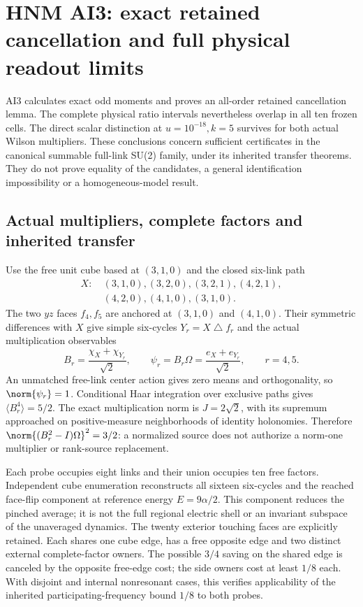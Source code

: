 \section{HNM AI3: exact retained cancellation and full physical readout limits\workstar}
AI3 calculates exact odd moments and proves an all-order retained cancellation lemma. The complete physical ratio intervals nevertheless overlap in all ten frozen cells. The direct scalar distinction at $u=10^{-18},k=5$ survives for both actual Wilson multipliers. These conclusions concern sufficient certificates in the canonical summable full-link SU(2) family, under its inherited transfer theorems. They do not prove equality of the candidates, a general identification impossibility or a homogeneous-model result.

\subsection{Actual multipliers, complete factors and inherited transfer}
Use the free unit cube based at $(3,1,0)$ and the closed six-link path
\begin{equation*}
 \begin{split}
 X:\ &(3,1,0),(3,2,0),(3,2,1),(4,2,1),\\
      &(4,2,0),(4,1,0),(3,1,0).
 \end{split}
\end{equation*}
The two $yz$ faces $f_4,f_5$ are anchored at $(3,1,0)$ and $(4,1,0)$. Their symmetric differences with $X$ give simple six-cycles $Y_r=X\mathbin{\triangle}f_r$ and the actual multiplication observables
\begin{equation}
 B_r=\frac{\chi_X+\chi_{Y_r}}{\sqrt2},\qquad
 \psi_r=B_r\Omega=\frac{e_X+e_{Y_r}}{\sqrt2},\qquad r=4,5.
 \label{r28:eq:ai3-sources}
\end{equation}
An unmatched free-link center action gives zero means and orthogonality, so $\norm{\psi_r}=1$. Conditional Haar integration over exclusive paths gives $\langle B_r^4\rangle=5/2$. The exact multiplication norm is $J=2\sqrt2$, with its supremum approached on positive-measure neighborhoods of identity holonomies. Therefore $\norm{(B_r^2-I)\Omega}^2=3/2$: a normalized source does not authorize a norm-one multiplier or rank-source replacement.

Each probe occupies eight links and their union occupies ten free factors. Independent cube enumeration reconstructs all sixteen six-cycles and the reached face-flip component at reference energy $E=9\alpha/2$. This component reduces the pinched average; it is not the full regional electric shell or an invariant subspace of the unaveraged dynamics. The twenty exterior touching faces are explicitly retained. Each shares one cube edge, has a free opposite edge and two distinct external complete-factor owners. The possible $3/4$ saving on the shared edge is canceled by the opposite free-edge cost; the side owners cost at least $1/8$ each. With disjoint and internal nonresonant cases, this verifies applicability of the inherited participating-frequency bound $1/8$ to both probes.


